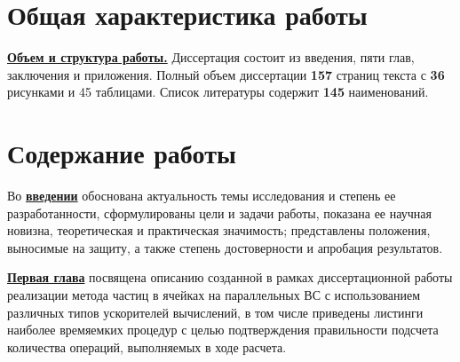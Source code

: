 
\section*{Общая характеристика работы}

\newcommand{\actuality}{\underline{\textbf{\actualityTXT}}}
\newcommand{\progress}{\underline{\textbf{\progressTXT}}}
\newcommand{\aim}{\underline{{\textbf\aimTXT}}}
\newcommand{\tasks}{\underline{\textbf{\tasksTXT}}}
\newcommand{\novelty}{\underline{\textbf{\noveltyTXT}}}
\newcommand{\influence}{\underline{\textbf{\influenceTXT}}}
\newcommand{\methods}{\underline{\textbf{\methodsTXT}}}
\newcommand{\defpositions}{\underline{\textbf{\defpositionsTXT}}}
\newcommand{\reliability}{\underline{\textbf{\reliabilityTXT}}}
\newcommand{\probation}{\underline{\textbf{\probationTXT}}}
\newcommand{\contribution}{\underline{\textbf{\contributionTXT}}}
\newcommand{\publications}{\underline{\textbf{\publicationsTXT}}}



\underline{\textbf{Объем и структура работы.}} Диссертация состоит из введения,
пяти глав, заключения и приложения. Полный объем диссертации
\textbf{157} страниц текста с \textbf{36} рисунками и 45 таблицами. Список литературы содержит \textbf{145} наименований.

\section*{Содержание работы}
Во \underline{\textbf{введении}} 
обоснована актуальность темы исследования и степень
ее разработанности, сформулированы цели и задачи работы, показана ее научная новизна, теоретическая и практическая значимость; представлены положения, выносимые на защиту, а также степень достоверности и апробация результатов.






\underline{\textbf{Первая глава}} посвящена описанию созданной в рамках диссертационной работы реализации метода частиц в ячейках на параллельных ВС с использованием различных типов ускорителей вычислений, в том числе приведены листинги наиболее времяемких процедур с целью подтверждения правильности подсчета количества операций, выполняемых в ходе расчета. 

